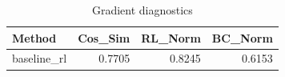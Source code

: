 \begin{table}[htbp]
\centering
\caption{Gradient diagnostics}
\label{tab:grad-diag}
\begin{tabular}{lrrr}
\toprule
\textbf{Method} & \textbf{Cos\_Sim} & \textbf{RL\_Norm} & \textbf{BC\_Norm} \\
\midrule
baseline\_rl & 0.7705 & 0.8245 & 0.6153 \\
\bottomrule
\end{tabular}
\end{table}